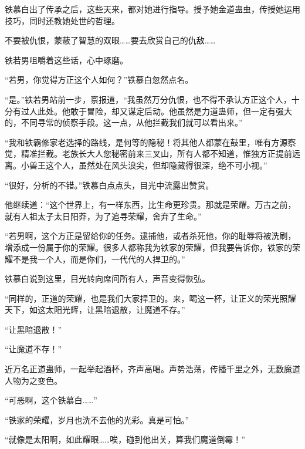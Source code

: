 \begin{this_body}
铁慕白出了传承之后，这些天来，都对她进行指导。授予她金道蛊虫，传授她运用技巧，同时还教她处世的哲理。

不要被仇恨，蒙蔽了智慧的双眼……要去欣赏自己的仇敌……

铁若男咀嚼着这些话，心中琢磨。

“若男，你觉得方正这个人如何？”铁慕白忽然点名。

“是。”铁若男站前一步，禀报道，“我虽然万分仇恨，也不得不承认方正这个人，十分有过人此处。他敢于冒险，却又谋定后动。他虽然是力道蛊师，但一定有强大的，不同寻常的侦察手段。这一点，从他拦截我们就可以看出来。”

“我和铁霸修家老选择的路线，是何等的隐秘！将其他人都蒙在鼓里，唯有方源察觉，精准拦截。老族长大人您秘密前来三叉山，所有人都不知道，惟独方正提前远离。小兽王这个人，虽然处在风头浪尖，但却隐藏得很深，绝不可小视。”

“很好，分析的不错。”铁慕白点点头，目光中流露出赞赏。

他继续道：“这个世界上，有一样东西，比生命更珍贵。那就是荣耀。万古之前，就有人祖太子太日阳莽，为了追寻荣耀，舍弃了生命。”

“若男啊，这个方正是留给你的任务。逮捕他，或者杀死他，你的耻辱将被洗刷，增添成一份属于你的荣耀。很多人都称我为铁家的荣耀，但我要告诉你，铁家的荣耀不是我一个人，而是你们，一代代的人捍卫的。”

铁慕白说到这里，目光转向席间所有人，声音变得恢弘。

“同样的，正道的荣耀，也是我们大家捍卫的。来，喝这一杯，让正义的荣光照耀天下，如这太阳光辉，让黑暗退散，让魔道不存。”

“让黑暗退散！”

“让魔道不存！”

近万名正道蛊师，一起举起酒杯，齐声高喝。声势浩荡，传播千里之外，无数魔道人物为之变色。

“可恶啊，这个铁慕白……”

“铁家的荣耀，岁月也洗不去他的光彩。真是可怕。”

“就像是太阳啊，如此耀眼……唉，碰到他出关，算我们魔道倒霉！”

\end{this_body}

